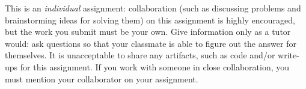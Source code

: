 \documentclass[letterpaper,11pt]{article}
\begin{document}


This is an \emph{individual} assignment: collaboration (such as discussing problems and brainstorming ideas for solving them) on this assignment is highly encouraged, but the work you submit must be your own. Give information only as a tutor would: ask questions so that your classmate is able to figure out the answer for themselves. It is unacceptable to share any artifacts, such as code and/or write-ups for this assignment. If you work with someone in close collaboration, you must mention your collaborator on your assignment.
\end{document}

